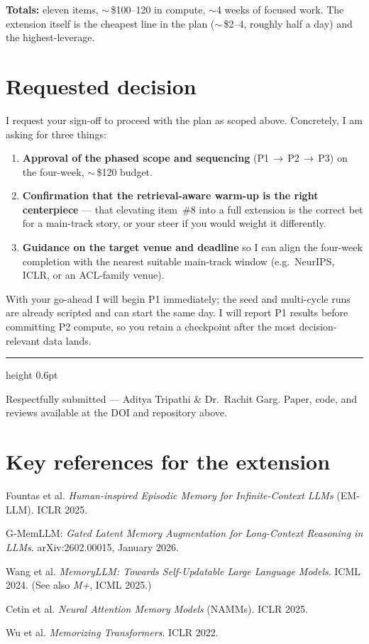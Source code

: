 \documentclass[11pt]{article}
\newcommand{\approxdollar}[1]{$\sim$\,\$#1}
\begin{document}
\textbf{Totals:} eleven items, \approxdollar{100--120} in compute, $\sim$4 weeks of focused work. The extension itself is the cheapest line in the plan (\approxdollar{2--4}, roughly half a day) and the highest-leverage.

\section{Requested decision}

I request your sign-off to proceed with the plan as scoped above. Concretely, I am asking for three things:

\begin{enumerate}
  \item \textbf{Approval of the phased scope and sequencing} (P1\,$\rightarrow$\,P2\,$\rightarrow$\,P3) on the four-week, \approxdollar{120} budget.
  \item \textbf{Confirmation that the retrieval-aware warm-up is the right centerpiece} --- that elevating item~\#8 into a full extension is the correct bet for a main-track story, or your steer if you would weight it differently.
  \item \textbf{Guidance on the target venue and deadline} so I can align the four-week completion with the nearest suitable main-track window (e.g.\ NeurIPS, ICLR, or an ACL-family venue).
\end{enumerate}

With your go-ahead I will begin P1 immediately; the seed and multi-cycle runs are already scripted and can start the same day. I will report P1 results before committing P2 compute, so you retain a checkpoint after the most decision-relevant data lands.

\vspace{0.8em}
{\color{rule}\hrule height 0.6pt}
\vspace{0.4em}
{\color{softgrey}\small Respectfully submitted --- Aditya Tripathi \& Dr.\ Rachit Garg. Paper, code, and reviews available at the DOI and repository above.}

\section*{Key references for the extension}
\small
\begin{enumerate}[leftmargin=1.6em, label={[\arabic*]}]
  \item Fountas et al. \emph{Human-inspired Episodic Memory for Infinite-Context LLMs} (EM-LLM). ICLR 2025.
  \item G-MemLLM: \emph{Gated Latent Memory Augmentation for Long-Context Reasoning in LLMs}. arXiv:2602.00015, January 2026.
  \item Wang et al. \emph{MemoryLLM: Towards Self-Updatable Large Language Models}. ICML 2024. (See also \emph{M+}, ICML 2025.)
  \item Cetin et al. \emph{Neural Attention Memory Models} (NAMMs). ICLR 2025.
  \item Wu et al. \emph{Memorizing Transformers}. ICLR 2022.
\end{enumerate}
\end{document}
